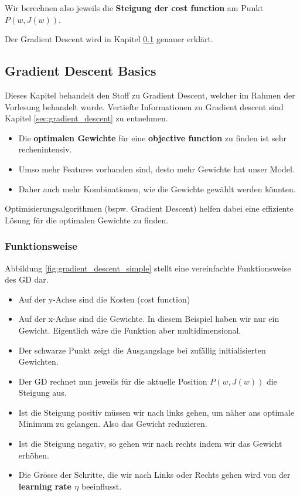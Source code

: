 Wir berechnen also jeweils die \textbf{Steigung der cost function} am Punkt $P(w, J(w))$.

Der Gradient Descent wird in Kapitel \ref{sec:gradient_descent_basics} genauer erklärt.

\subsection{Gradient Descent Basics}
\label{sec:gradient_descent_basics}

Dieses Kapitel behandelt den Stoff zu Gradient Descent, welcher im Rahmen der Vorlesung behandelt wurde. Vertiefte Informationen zu Gradient descent sind Kapitel \ref{sec:gradient_descent} zu entnehmen.


\begin{itemize}
	\item Die \textbf{optimalen Gewichte} für eine \textbf{objective function} zu finden ist sehr rechenintensiv.
	\item Umso mehr Features vorhanden sind, desto mehr Gewichte hat unser Model.
	\item Daher auch mehr Kombinationen, wie die Gewichte gewählt werden könnten.
\end{itemize}

Optimisierungsalgorithmen (bspw. Gradient Descent) helfen dabei eine effiziente Lösung für die optimalen Gewichte zu finden.


\newpage
\subsubsection{Funktionsweise}

Abbildung \ref{fig:gradient_descent_simple} stellt eine vereinfachte Funktionsweise des GD dar.

\begin{itemize}
	\item Auf der y-Achse sind die Kosten (cost function)
	\item Auf der x-Achse sind die Gewichte. In diesem Beispiel haben wir nur ein Gewicht. Eigentlich wäre die Funktion aber multidimensional.
	\item Der schwarze Punkt zeigt die Ausgangslage bei zufällig initialisierten Gewichten.
	\item Der GD rechnet nun jeweils für die aktuelle Position $P(w, J(w))$ die Steigung aus.
	\item Ist die Steigung positiv müssen wir nach links gehen, um näher ans optimale Minimum zu gelangen. Also das Gewicht reduzieren.
	\item Ist die Steigung negativ, so gehen wir nach rechts indem wir das Gewicht erhöhen.
	\item Die Grösse der Schritte, die wir nach Links oder Rechts gehen wird von der \textbf{learning rate $\eta$} beeinflusst.
\end{itemize}

